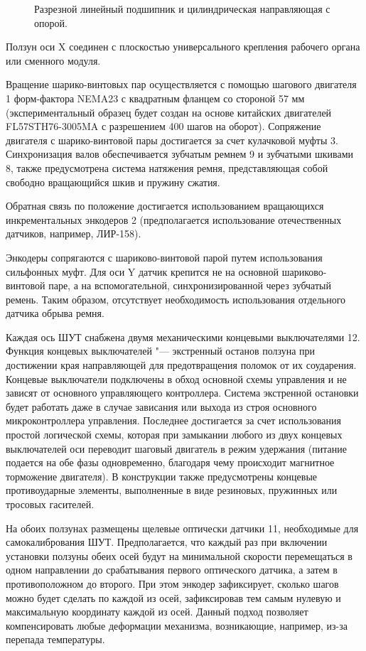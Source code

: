 \begin{figure}[ht]
	\caption{Разрезной линейный подшипник и цилиндрическая направляющая с опорой.}\label{fig:bearing}
\end{figure}

Ползун оси X соединен с плоскостью универсального крепления рабочего органа или сменного модуля.

Вращение шарико-винтовых пар осуществляется с помощью шагового двигателя 1 форм-фактора NEMA23 с квадратным фланцем со стороной 57 мм (экспериментальный образец будет создан на основе китайских двигателей FL57STH76-3005MA с разрешением 400 шагов на оборот). Сопряжение двигателя с шарико-винтовой пары достигается за счет кулачковой муфты 3. Синхронизация валов обеспечивается зубчатым ремнем 9 и зубчатыми шкивами 8, также предусмотрена система натяжения ремня, представляющая собой свободно вращающийся шкив и пружину сжатия.

Обратная связь по положение достигается использованием вращающихся инкрементальных энкодеров 2 (предполагается использование отечественных датчиков, например, ЛИР-158).

Энкодеры сопрягаются с шариково-винтовой парой путем использования сильфонных муфт. Для оси Y датчик крепится не на основной шариково-винтовой паре, а на вспомогательной, синхронизированной через зубчатый ремень. Таким образом, отсутствует необходимость использования отдельного датчика обрыва ремня. 

Каждая ось ШУТ снабжена двумя механическими концевыми выключателями 12. Функция концевых выключателей "--- экстренный останов ползуна при достижении края направляющей для предотвращения поломок от их соударения. Концевые выключатели подключены в обход основной схемы управления и не зависят от основного управляющего контроллера. Система экстренной остановки будет работать даже в случае зависания или выхода из строя основного микроконтроллера управления. Последнее достигается за счет использования простой логической схемы, которая при замыкании любого из двух концевых выключателей оси переводит шаговый двигатель в режим удержания (питание подается на обе фазы одновременно, благодаря чему происходит магнитное торможение двигателя). В конструкции также предусмотрены концевые противоударные элементы, выполненные в виде резиновых, пружинных или тросовых гасителей.

На обоих ползунах размещены щелевые оптически датчики 11, необходимые для самокалибрования ШУТ. Предполагается, что каждый раз при включении установки ползуны обеих осей будут на минимальной скорости перемещаться в одном направлении до срабатывания первого оптического датчика, а затем в противоположном до второго. При этом энкодер зафиксирует, сколько шагов можно будет сделать по каждой из осей, зафиксировав тем самым нулевую и максимальную координату каждой из осей. Данный подход позволяет компенсировать любые деформации механизма, возникающие, например, из-за перепада температуры.


